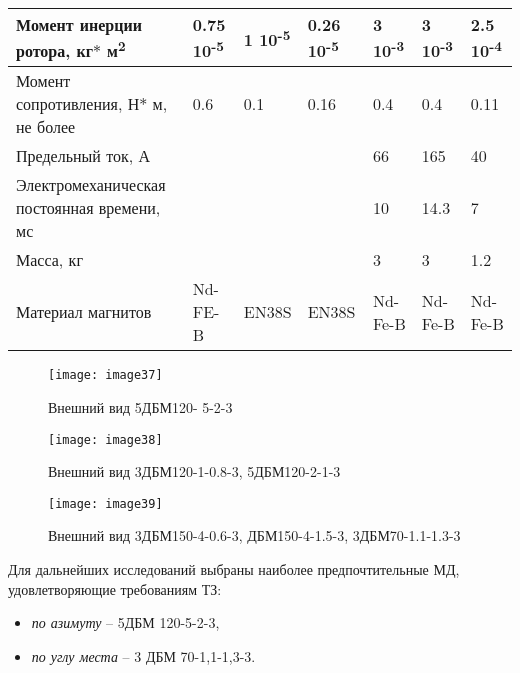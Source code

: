 \begin{landscape}
\begin{table}[!h]
\begin{longtable}{|m{10cm}|m{2.2cm}|m{2.2cm}|m{2.2cm}|m{2.2cm}|m{2.2cm}|m{2.2cm}|}
		\hline
		Момент инерции ротора, кг$\ast$ м\textsuperscript{2} & 
		0.75 10\textsuperscript{-5} & 
		{1 10\textsuperscript{-5}} & 
		{0.26 10\textsuperscript{-5}} & 
		{3 10\textsuperscript{-3}} & 
		{3 10\textsuperscript{-3}} & 
		{2.5 10\textsuperscript{-4 }} \\
		\hline
		Момент сопротивления, Н$\ast$ м, не более & 
		0.6 & 
		{0.1} & 
		{0.16} & 
		{0.4} & 
		{0.4} & 
		{0.11} \\
		\hline
		Предельный ток, А & 
		 & 
		{} & 
		{} & 
		{66} & 
		{165} & 
		{40} \\
		\hline
		Электромеханическая постоянная времени, мс & 
		 & 
		{} & 
		{} & 
		{10} & 
		{14.3} & 
		{7} \\
		\hline
		Масса, кг & 
		 & 
		{} & 
		{} & 
		{3} & 
		{3} & 
		{1.2} \\
		\hline
		Материал магнитов & 
		Nd-FE-B & 
		{EN38S} & 
		{EN38S} & 
		{Nd-Fe-B} & 
		{Nd-Fe-B} & 
		{Nd-Fe-B} \\
		\hline
		
\end{longtable}
\end{table}
\end{landscape}

\begin{figure}[ht]
	\centering
	\texttt{[image: image37]} 
	\caption{Внешний вид 5ДБМ120- 5-2-3}
	\label{fig:5DBM120}
\end{figure}

\begin{figure}[ht]
	\centering
	\texttt{[image: image38]} 
	\caption{Внешний вид 3ДБМ120-1-0.8-3, 5ДБМ120-2-1-3}
	\label{fig:3DBM120}
\end{figure}

\begin{figure}[ht]
	\centering
	\texttt{[image: image39]} 
	\caption{Внешний вид 3ДБМ150-4-0.6-3, ДБМ150-4-1.5-3, 3ДБМ70-1.1-1.3-3}
	\label{fig:3DBM70}
\end{figure}

Для дальнейших исследований выбраны наиболее предпочтительные МД, удовлетворяющие требованиям ТЗ:\par

\begin{itemize}
	\item \textit{по азимуту} –  5ДБМ 120-5-2-3,
	\item \textit{по углу места} – 3 ДБМ 70-1,1-1,3-3.
\end{itemize}




